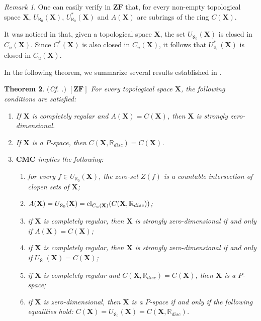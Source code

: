 \documentclass[12pt,twoside,leqno]{article}
\theoremstyle{plain}
\newtheorem{theorem}{Theorem}[section]
\theoremstyle{definition}
\theoremstyle{remark}
\newtheorem{remark}[theorem]{Remark}
\DeclareMathOperator{\cl}{{\rm cl}}
\begin{document}
\begin{remark}
	\label{s1:r20}
	One can easily verify in $\mathbf{ZF}$ that, for every non-empty topological space $\mathbf{X}$, $U_{\aleph_0}(\mathbf{X})$, $U_{\aleph_0}^{\ast}(\mathbf{X})$ and $A(\mathbf{X})$ are subrings of the ring $C(\mathbf{X})$.  
	
	It was noticed in \cite{kow} that, given a topological space $\mathbf{X}$, the set $U_{\aleph_0}(\mathbf{X})$ is closed in $C_{u}(\mathbf{X})$. Since $C^{\ast}(\mathbf{X})$ is also closed in $C_{u}(\mathbf{X})$, it follows that $U_{\aleph_0}^{\ast}(\mathbf{X})$ is closed in  $C_{u}(\mathbf{X})$.
\end{remark}

In the following theorem, we summarize several results established in \cite{kow}.

\begin{theorem}
	\label{s1:t21}
	$($Cf. \cite{kow}.$)$ $[\mathbf{ZF}]$ For every topological space $\mathbf{X}$, the following conditions are satisfied:
	\begin{enumerate}
		\item[(a)] If $\mathbf{X}$ is completely regular and $A(\mathbf{X})=C(\mathbf{X})$, then $\mathbf{X}$ is strongly zero-dimensional.
		\item[(b)] If $\mathbf{X}$ is a $P$-space, then $C(\mathbf{X}, \mathbb{R}_{disc})=C(\mathbf{X})$.
		\item[(c)]  $\mathbf{CMC}$ implies the following:
		\begin{enumerate}
			\item[(i)] for every $f\in U_{\aleph_0}(\mathbf{X})$, the zero-set $Z(f)$ is a countable intersection of clopen sets of $\mathbf{X}$; 
			\item[(ii)] $A(\mathbf{X})=U_{\aleph_0}(\mathbf{X})=\cl_{C_{u}(\mathbf{X})}(C(\mathbf{X},\mathbb{R}_{disc}))$;
			\item[(iii)] if $\mathbf{X}$ is completely regular, then $\mathbf{X}$ is strongly zero-dimensional if and only if $A(\mathbf{X})=C(\mathbf{X})$;
			\item[(iv)] if $\mathbf{X}$ is completely regular, then $\mathbf{X}$ is strongly zero-dimensional if and only if $U_{\aleph_0}(\mathbf{X})=C(\mathbf{X})$;
			\item[(v)] if $\mathbf{X}$ is completely regular and $C(\mathbf{X}, \mathbb{R}_{disc})=C(\mathbf{X})$, then $\mathbf{X}$ is a $P$-space;
			\item[(vi)] if $\mathbf{X}$ is zero-dimensional, then $\mathbf{X}$ is a $P$-space if and only if the following equalities hold: $C(\mathbf{X})=U_{\aleph_0}(\mathbf{X})=C(\mathbf{X}, \mathbb{R}_{disc})$.
		\end{enumerate}
	\end{enumerate}
\end{theorem}
\end{document}
